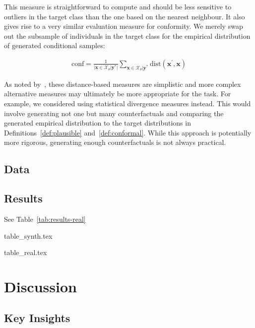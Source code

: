 \documentclass{article}
\begin{document}
This measure is straightforward to compute and should be less sensitive to outliers in the target class than the one based on the nearest neighbour. It also gives rise to a very similar evaluation measure for conformity. We merely swap out the subsample of individuals in the target class for the empirical distribution of generated conditional samples:

\begin{equation}\label{eq:conf}
  \begin{aligned}
    \text{conf} = \frac{1}{\lvert\mathbf{x} \in \mathcal{X}_{\theta}|\mathbf{y}^*\rvert} \sum_{\mathbf{x} \in \mathcal{X}_{\theta}|\mathbf{y}^*} \text{dist}(\mathbf{x}^{\prime},\mathbf{x})
  \end{aligned}
\end{equation}

As noted by~\citet{guidotti2022counterfactual}, these distance-based measures are simplistic and more complex alternative measures may ultimately be more appropriate for the task. For example, we considered using statistical divergence measures instead. This would involve generating not one but many counterfactuals and comparing the generated empirical distribution to the target distributions in Definitions~\ref{def:plausible} and~\ref{def:conformal}. While this approach is potentially more rigorous, generating enough counterfactuals is not always practical. 

\subsection{Data}

\subsection{Results}

See Table~\ref{tab:results-real}

{table_synth.tex}

{table_real.tex}

\section{Discussion}

\subsection{Key Insights}
\end{document}
